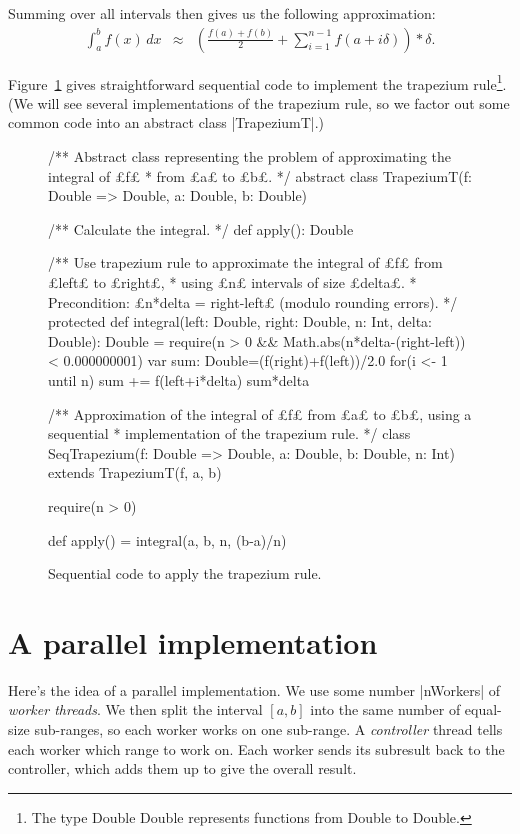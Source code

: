 Summing over all intervals then gives us the following approximation:
\begin{eqnarray*}
\int_a^b f(x) \, dx  & \approx & 
  \left( \frac{f(a)+f(b)}{2} + \sum_{i=1}^{n-1} f(a+i\delta) \right) * \delta.
\end{eqnarray*}

Figure~\ref{fig:trapezium-sequential} gives straightforward sequential code to
implement the trapezium rule\footnote{The type {\scalashape Double
    \protect\SCALA{=>} Double} represents functions from {\scalashape Double}
  to {\scalashape Double}.}.  (We will see several implementations of the
trapezium rule, so we factor out some common code into an abstract class
|TrapeziumT|.)


\begin{figure}
\begin{scala}
/** Abstract class representing the problem of approximating the integral of £f£
  * from £a£ to £b£. */
abstract class TrapeziumT(f: Double => Double, a: Double, b: Double){
  /** Calculate the integral. */
  def apply(): Double

  /** Use trapezium rule to approximate the integral of £f£ from £left£ to £right£, 
    * using £n£ intervals of size £delta£. 
    * Precondition: £n*delta = right-left£ (modulo rounding errors). */
  protected 
  def integral(left: Double, right: Double, n: Int, delta: Double): Double = {
    require(n > 0 && Math.abs(n*delta-(right-left)) < 0.000000001) 
    var sum: Double=(f(right)+f(left))/2.0
    for(i <- 1 until n) sum += f(left+i*delta)
    sum*delta
  }
}

/** Approximation of the integral of £f£ from £a£ to £b£, using a sequential 
  * implementation of the trapezium rule. */
class SeqTrapezium(f: Double => Double, a: Double, b: Double, n: Int)
    extends TrapeziumT(f, a, b){
  require(n > 0)

  def apply() = integral(a, b, n, (b-a)/n)
}
\end{scala}
\caption{Sequential code to apply the trapezium rule.}
\label{fig:trapezium-sequential}
\end{figure}


\section{A parallel implementation}

Here's the idea of a parallel implementation.  We use some number |nWorkers|
of \emph{worker threads}.  We then split the interval $[a,b]$ into the same
number of equal-size sub-ranges, so each worker works on one sub-range.  A
\emph{controller} thread tells each worker which range to work on.  Each
worker sends its subresult back to the controller, which adds them up to give
the overall result.

